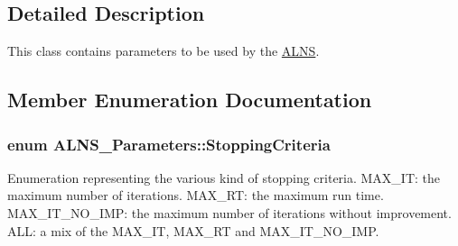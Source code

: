 \subsection{Detailed Description}
This class contains parameters to be used by the \hyperlink{classALNS}{A\-L\-N\-S}. 

\subsection{Member Enumeration Documentation}
\hypertarget{classALNS__Parameters_ae252d050b207dee5b442ca7d02c1d831}{
\subsubsection[{Stopping\-Criteria}]{\setlength{\rightskip}{0pt plus 5cm}enum {\bf A\-L\-N\-S\-\_\-\-Parameters\-::\-Stopping\-Criteria}}}\label{classALNS__Parameters_ae252d050b207dee5b442ca7d02c1d831}
Enumeration representing the various kind of stopping criteria. M\-A\-X\-\_\-\-I\-T\-: the maximum number of iterations. M\-A\-X\-\_\-\-R\-T\-: the maximum run time. M\-A\-X\-\_\-\-I\-T\-\_\-\-N\-O\-\_\-\-I\-M\-P\-: the maximum number of iterations without improvement. A\-L\-L\-: a mix of the M\-A\-X\-\_\-\-I\-T, M\-A\-X\-\_\-\-R\-T and M\-A\-X\-\_\-\-I\-T\-\_\-\-N\-O\-\_\-\-I\-M\-P. 

